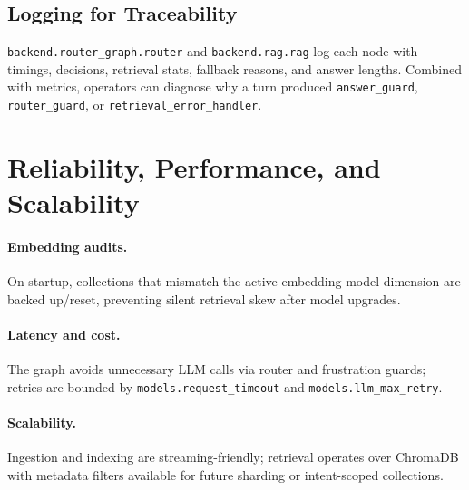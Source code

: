 \documentclass[11pt]{article}
\begin{document}
\subsection{Logging for Traceability}
\texttt{backend.router\_graph.router} and \texttt{backend.rag.rag} log each node with timings, decisions, retrieval stats, fallback reasons, and answer lengths. Combined with metrics, operators can diagnose why a turn produced \texttt{answer\_guard}, \texttt{router\_guard}, or \texttt{retrieval\_error\_handler}.


\section{Reliability, Performance, and Scalability}
\paragraph{Embedding audits.} On startup, collections that mismatch the active embedding model dimension are backed up/reset, preventing silent retrieval skew after model upgrades.

\paragraph{Latency and cost.} The graph avoids unnecessary LLM calls via router and frustration guards; retries are bounded by \texttt{models.request\_timeout} and \texttt{models.llm\_max\_retry}.

\paragraph{Scalability.} Ingestion and indexing are streaming-friendly; retrieval operates over ChromaDB with metadata filters available for future sharding or intent-scoped collections.
\end{document}
